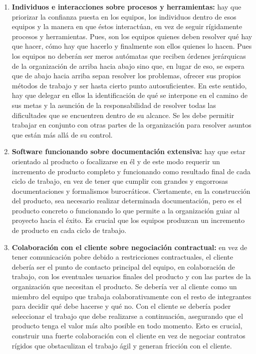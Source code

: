 \begin{enumerate}

\item \textbf{Individuos e interacciones sobre procesos y herramientas:} hay que priorizar la confianza puesta en los equipos, los individuos dentro de esos equipos y la manera en que éstos interactúan, en vez de seguir rígidamente procesos y herramientas. Pues, son los equipos quienes deben resolver qué hay que hacer, cómo hay que hacerlo y finalmente son ellos quienes lo hacen. Pues los equipos no deberán ser meros autómatas que reciben órdenes jerárquicas de la organización de arriba hacia abajo sino que, en lugar de eso, se espera que de abajo hacia arriba sepan resolver los problemas, ofrecer sus propios métodos de trabajo y ser hasta cierto punto autosuficientes. En este sentido, hay que delegar en ellos la identificación de qué se interpone en el camino de sus metas y la asunción de la responsabilidad de resolver todas las dificultades que se encuentren dentro de su alcance. Se les debe permitir trabajar en conjunto con otras partes de la organización para resolver asuntos que están más allá de su control.

\item \textbf{Software funcionando sobre documentación extensiva:} hay que estar orientado al producto o focalizarse en él y de este modo requerir un incremento de producto completo y funcionando como resultado final de cada ciclo de trabajo, en vez de tener que cumplir con grandes y engorrosas documentaciones y formalismos burocráticos. Ciertamente, en la construcción del producto, sea necesario realizar determinada documentación, pero es el producto concreto o funcionando lo que permite a la organización guiar al proyecto hacia el éxito. Es crucial que los equipos produzcan un incremento de producto en cada ciclo de trabajo.

\item \textbf{Colaboración con el cliente sobre negociación contractual:} en vez de tener comunicación pobre debido a restricciones contractuales, el cliente debería ser el punto de contacto principal del equipo, en colaboración de trabajo, con los eventuales usuarios finales del producto y con las partes de la organización que necesitan el producto. Se debería ver al cliente como un miembro del equipo que trabaja colaborativamente con el resto de integrantes para decidir qué debe hacerse y qué no. Con el cliente se debería poder seleccionar el trabajo que debe realizarse a continuación, asegurando que el producto tenga el valor más alto posible en todo momento. Esto es crucial, construir una fuerte colaboración con el cliente en vez de negociar contratos rígidos que obstaculizan el trabajo ágil y generan fricción con el cliente.


\end{enumerate}
